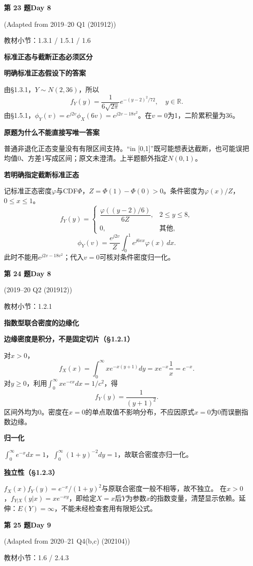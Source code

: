 \documentclass[10.5pt,fontset=fandol]{ctexart}
\newcommand{\key}[1]{\par\vspace{4pt}\noindent\textbf{\color{navy}#1}\par\vspace{2pt}}
\newcommand{\qtitle}[2]{\par\addvspace{1.2em}\Needspace{8\baselineskip}\begin{tcolorbox}[colback=navy,colframe=navy,arc=1.5pt,boxrule=0pt]\color{white}\large\bfseries #1\hfill\small #2\end{tcolorbox}}
\begin{document}
\qtitle{第 23 题}{Day 8}
{\small\color{accentred}(Adapted from 2019--20 Q1 (201912))}\par\smallskip
{\small\color{muted}教材小节：1.3.1 / 1.5.1 / 1.6}\par\medskip
\noindent\textbf{标准正态与截断正态必须区分}\par\smallskip\begin{tcolorbox}[breakable,colback=qbg,colframe=qbg,boxrule=0pt]\key{明确标准正态假设下的答案}
由§1.3.1，$Y\sim N(2,36)$，所以
\[\boxed{f_Y(y)=\frac{1}{6\sqrt{2\pi}}e^{-(y-2)^2/72},\quad y\in\mathbb R.}\]
由§1.5.1，$\phi_Y(v)=e^{j2v}\phi_X(6v)=\boxed{e^{j2v-18v^2}}$。在$v=0$为1，二阶累积量为36。
\key{原题为什么不能直接写唯一答案}
普通非退化正态变量没有有限区间支持。“in [0,1]”既可能想表达截断，也可能误把均值0、方差1写成区间；原文未澄清。上半题额外指定$N(0,1)$。
\key{若明确指定截断标准正态}
记标准正态密度$\varphi$与CDF$\Phi$，$Z=\Phi(1)-\Phi(0)>0$。条件密度为$\varphi(x)/Z$，$0\le x\le1$。
\[f_Y(y)=\begin{cases}\dfrac{\varphi((y-2)/6)}{6Z},&2\le y\le8,\\0,&\text{其他},\end{cases}\]
\[\phi_Y(v)=\frac{e^{j2v}}{Z}\int_0^1 e^{j6vx}\varphi(x)\,dx.\]
此时不能用$e^{j2v-18v^2}$；代入$v=0$可核对条件密度归一化。
\end{tcolorbox}
\qtitle{第 24 题}{Day 8}
{\small\color{accentred}(2019--20 Q2 (201912))}\par\smallskip
{\small\color{muted}教材小节：1.2.1}\par\medskip
\noindent\textbf{指数型联合密度的边缘化}\par\smallskip\begin{tcolorbox}[breakable,colback=qbg,colframe=qbg,boxrule=0pt]\key{边缘密度是积分，不是固定切片（§1.2.1）}
对$x>0$，
\[f_X(x)=\int_0^\infty xe^{-x(y+1)}dy=xe^{-x}\frac1x=\boxed{e^{-x}}.\]
对$y\ge0$，利用$\int_0^\infty xe^{-cx}dx=1/c^2$，得
\[\boxed{f_Y(y)=\frac1{(y+1)^2}}.\]
区间外均为0。密度在$x=0$的单点取值不影响分布，不应因原式$x=0$为0而误删指数边缘。
\key{归一化}
$\int_0^\infty e^{-x}dx=1$，$\int_0^\infty (1+y)^{-2}dy=1$，故联合密度亦归一化。
\key{独立性（§1.2.3）}
$f_X(x)f_Y(y)=e^{-x}/(1+y)^2$与原联合密度一般不相等，故不独立。
在$x>0$，$f_{Y|X}(y|x)=xe^{-xy}$，即给定$X=x$后$Y$为参数$x$的指数变量，清楚显示依赖。延伸：$E(Y)=\infty$，不能未经检查套用有限矩公式。
\end{tcolorbox}
\qtitle{第 25 题}{Day 9}
{\small\color{accentred}(Adapted from 2020--21 Q4(b,c) (202104))}\par\smallskip
{\small\color{muted}教材小节：1.6 / 2.4.3}\par\medskip
\end{document}
